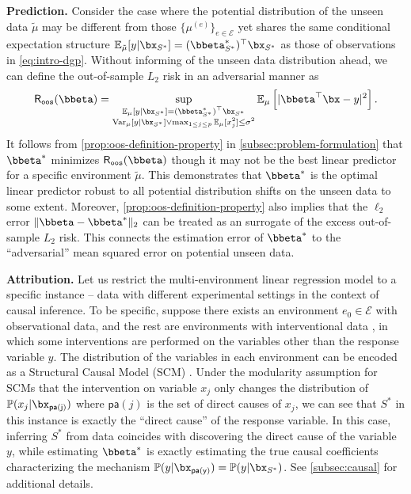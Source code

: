 \documentclass[10pt]{article}
\numberwithin{equation}{section}
\begin{document}
{\noindent \textbf{Prediction.} Consider the case where the potential distribution of the unseen data $\tilde{\mu}$ may be different from those $\{\mu^{(e)}\}_{e\in \mathcal{E}}$ yet shares the same conditional expectation structure $\mathbb{E}_{\tilde{\mu}}[y|\bx_{S^*}] = (\bbeta^*_{S^*})^\top \bx_{S^*}$ as those of observations in \eqref{eq:intro-dgp}. Without informing of the unseen data distribution ahead, we can define the out-of-sample $L_2$ risk in an adversarial manner as
\begin{align*}
    \mathsf{R}_{\mathtt{oos}}(\bbeta) = \sup_{\substack{\mathbb{E}_\mu[y|\bx_{S^*}] = (\bbeta^*_{S^*})^\top \bx_{S^*} \\ \mathrm{Var}_{\mu}[y|\bx_{S^*}] \lor \max_{1\le j\le p}\mathbb{E}_{\mu}[x_j^2] \le \sigma^2}}  \mathbb{E}_{\mu}\left[|\bbeta^\top \bx - y|^2\right].
\end{align*} 
It follows from \cref{prop:oos-definition-property} in \cref{subsec:problem-formulation} that $\bbeta^*$ minimizes $\mathsf{R}_{\mathtt{oos}}(\bbeta)$ though it may not be the best linear predictor for a specific environment $\tilde{\mu}$. This demonstrates that $\bbeta^*$ is the optimal linear predictor robust to all potential distribution shifts on the unseen data to some extent. Moreover, \cref{prop:oos-definition-property} also implies that the $\ell_2$ error $\|\bbeta - \bbeta^*\|_2$ can be treated as an surrogate of the excess out-of-sample $L_2$ risk. This connects the estimation error of $\bbeta^*$ to the ``adversarial'' mean squared error on potential unseen data.

\noindent \textbf{Attribution.} Let us restrict the multi-environment linear regression model to a specific instance -- data with different experimental settings \citep{didelez2012direct, peters2016causal} in the context of causal inference. To be specific, suppose there exists an environment $e_0\in \mathcal{E}$ with observational data, and the rest are environments with interventional data \citep{he2008active}, in which some interventions are performed on the variables other than the response variable $y$. The distribution of the variables in each environment can be encoded as a Structural Causal Model (SCM) \citep{glymour2016causal}. Under the modularity \citep{scholkopf2012causal} assumption for SCMs that the intervention on variable $x_j$ only changes the distribution of $\mathbb{P}(x_j|\bx_\mathsf{pa(j)})$ where $\mathsf{pa}(j)$ is the set of direct causes of $x_j$, we can see that $S^*$ in this instance is exactly the ``direct cause'' of the response variable. In this case, inferring $S^*$ from data coincides with discovering the direct cause of the variable $y$, while estimating $\bbeta^*$ is exactly estimating the true causal coefficients characterizing the mechanism $\mathbb{P}(y|\bx_{\mathsf{pa(y)}})=\mathbb{P}(y|\bx_{S^*})$.  See \cref{subsec:causal} for additional details.

}
\end{document}
